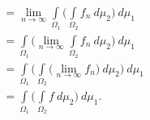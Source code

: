 \begin{rj}[\ref{zad:4.15}]
\begin{enumerate}[label=(\roman*)]
\begin{enumerate}[label=\arabic*. korak:]
\begin{equation*}
\begin{aligned}
                    &= \lim\limits_{n \to \infty} \int\limits_{\Omega_1} \Big( \int\limits_{\Omega_2} f_n \: d \mu_2 \Big) \: d \mu_1\\
                    &= \int\limits_{\Omega_1} \Big( \lim\limits_{n \to \infty} \int\limits_{\Omega_2} f_n \: d \mu_2 \Big) \: d \mu_1\\
                    &= \int\limits_{\Omega_1} \Big( \int\limits_{\Omega_2} \big( \lim\limits_{n \to \infty} f_n \big) \: d \mu_2 \Big) \: d \mu_1\\
                    &= \int\limits_{\Omega_1} \Big( \int\limits_{\Omega_2} f \: d \mu_2 \Big) \: d \mu_1.
                \end{aligned}
            \end{equation*}
        \end{enumerate}
    \end{enumerate}
\end{rj}

